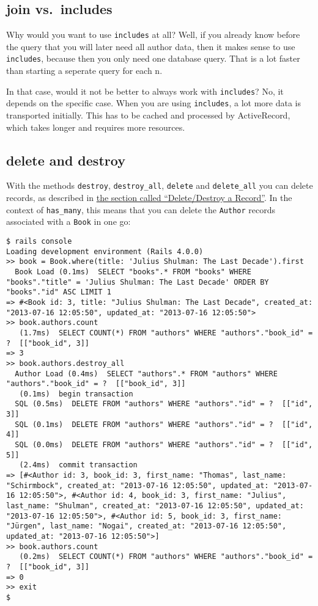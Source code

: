 \documentclass[a4paper]{book}
\newcounter{tab}[chapter]
\begin{document}
\subsection{join vs.~includes}\label{join-vs.includes}

Why would you want to use \texttt{includes} at all? Well, if you already know before the query that you will later need all author data, then it makes sense to use \texttt{includes}, because then you only need one database query. That is a lot faster than starting a seperate query for each n.

In that case, would it not be better to always work with \texttt{includes}? No, it depends on the specific case. When you are using \texttt{includes}, a lot more data is transported initially. This has to be cached and processed by ActiveRecord, which takes longer and requires more resources.

\subsection{delete and destroy}\label{delete-and-destroy}

With the methods \texttt{destroy}, \texttt{destroy\_all}, \texttt{delete} and \texttt{delete\_all} you can delete records, as described in \hyperref[datensatz-loeschen]{the section called “Delete/Destroy a Record”}. In the context of \texttt{has\_many}, this means that you can delete the \texttt{Author} records associated with a \texttt{Book} in one go:

\begin{shaded}\begin{verbatim}
$ rails console
Loading development environment (Rails 4.0.0)
>> book = Book.where(title: 'Julius Shulman: The Last Decade').first
  Book Load (0.1ms)  SELECT "books".* FROM "books" WHERE "books"."title" = 'Julius Shulman: The Last Decade' ORDER BY "books"."id" ASC LIMIT 1
=> #<Book id: 3, title: "Julius Shulman: The Last Decade", created_at: "2013-07-16 12:05:50", updated_at: "2013-07-16 12:05:50">
>> book.authors.count
   (1.7ms)  SELECT COUNT(*) FROM "authors" WHERE "authors"."book_id" = ?  [["book_id", 3]]
=> 3
>> book.authors.destroy_all
  Author Load (0.4ms)  SELECT "authors".* FROM "authors" WHERE "authors"."book_id" = ?  [["book_id", 3]]
   (0.1ms)  begin transaction
  SQL (0.5ms)  DELETE FROM "authors" WHERE "authors"."id" = ?  [["id", 3]]
  SQL (0.1ms)  DELETE FROM "authors" WHERE "authors"."id" = ?  [["id", 4]]
  SQL (0.0ms)  DELETE FROM "authors" WHERE "authors"."id" = ?  [["id", 5]]
   (2.4ms)  commit transaction
=> [#<Author id: 3, book_id: 3, first_name: "Thomas", last_name: "Schirmbock", created_at: "2013-07-16 12:05:50", updated_at: "2013-07-16 12:05:50">, #<Author id: 4, book_id: 3, first_name: "Julius", last_name: "Shulman", created_at: "2013-07-16 12:05:50", updated_at: "2013-07-16 12:05:50">, #<Author id: 5, book_id: 3, first_name: "Jürgen", last_name: "Nogai", created_at: "2013-07-16 12:05:50", updated_at: "2013-07-16 12:05:50">]
>> book.authors.count
   (0.2ms)  SELECT COUNT(*) FROM "authors" WHERE "authors"."book_id" = ?  [["book_id", 3]]
=> 0
>> exit
$
\end{verbatim}\end{shaded}
\end{document}
